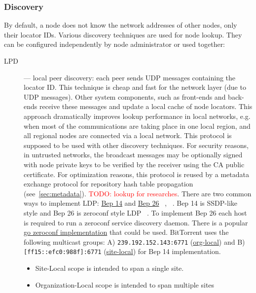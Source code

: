 \documentclass[acmlarge, screen, nonacm, 11pt]{acmart}
\newcommand{\code}[1]{\texttt{#1}}
\newcommand{\todo}[1]{\textcolor{red}{TODO: #1}}
\begin{document}
\subsubsection{Discovery}\label{sec:discovery}

By default, a node does not know the network addresses of other nodes,
only their locator IDs.
Various discovery techniques are used for node lookup.
They can be configured independently by node
administrator or used together:

\begin{description}
  \item[LPD] --- local peer discovery: each peer sends UDP messages containing the locator ID.
    This technique is cheap and fast for the network layer (due to UDP messages). Other system components,
    such as front-ends and back-ends receive these messages and update a local cache of node locators.
    This approach dramatically improves lookup performance in local networks, e.g. when most of the communications
    are taking place in one local region, and all regional nodes are connected via a local network.
    This protocol is supposed to be used with other discovery techniques.
    For security reasons, in untrusted networks, the broadcast messages may be optionally signed with
    node private keys to be verified by the receiver using the CA public certificate.
    For optimization reasons, this protocol is reused by a metadata exchange protocol for
    repository hash table propagation (see~\ref{sec:metadata}). \todo{lookup for researches}.
    There are two common ways to implement LDP: \href{http://bittorrent.org/beps/bep_0014.html}{Bep 14} and \href{http://bittorrent.org/beps/bep_0026.html}{Bep 26} ~\cite{bittorrent}, ~\cite{carlsson2012longitudinal}.
    Bep 14 is SSDP-like style and Bep 26 is zeroconf style LDP ~\cite{siddiqui2012zero}. To implement Bep 26 each host is required to run a zeroconf service discovery daemon.
    There is a popular \href{https://github.com/grandcat/zeroconf}{go zeroconf implementation} that could be used.
    BitTorrent uses the following multicast groups: A) \code{239.192.152.143:6771} (\href{https://tools.ietf.org/html/rfc2365#section-6.2}{org-local}) and B) \code{[ff15::efc0:988f]:6771} (\href{https://tools.ietf.org/html/rfc4291#section-2.5.7}{site-local}) for Bep 14 implementation.
    \begin{itemize}
      \item Site-Local scope is intended to span a single site.
      \item Organization-Local scope is intended to span multiple sites

\end{itemize}
\end{description}
\end{document}
